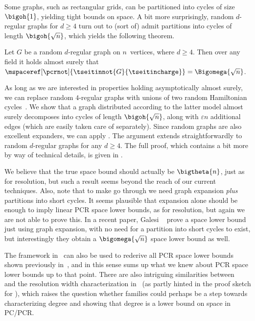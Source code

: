 \documentclass{toc}
\begin{document}
Some graphs, such as rectangular grids, can be partitioned into cycles
of size~$\bigoh{1}$, yielding tight bounds on space.
A bit more surprisingly, random \mbox{$d$-regular} graphs for $d \geq 4$ turn out to
(sort of)
admit partitions into cycles of %
length
$\bigoh{\sqrt{n}}$,
which yields the following theorem.

\begin{theorem}
  \label{thm:improved-general}
  Let $G$ be a random $d$-regular graph on $n$~vertices, where $d\geq 4$.
  Then over any field it holds almost surely that
  $\mspaceref[\pcrnot]{\tseitinnot{G}{\tseitincharge}} = \Bigomega{\sqrt{n}}$.
\end{theorem}

\begin{ourproof}[sketch]
  As long as we are interested in properties holding asymptotically
  almost surely, we can replace random $4$-regular graphs with unions
  of two random Hamiltonian cycles~\cite{KW}.
  We show that a graph distributed according to the latter
  model almost surely decomposes into cycles of length
  $\bigoh{\sqrt{n}}$, along with $\varepsilon n$ additional edges 
  (which are easily taken care of separately).
  Since random graphs are also excellent expanders, we can
  apply 
 .
  The argument  
  extends straightforwardly
  to random $d$-regular graphs for any 
  $d  \geq 4$.
  The full proof, which contains a bit more by way of technical
  details, is  given in
 .
\end{ourproof}

%
We 
%
believe that the true space bound should actually be
$\bigtheta{n}$, just as for resolution, but such a result seems beyond
the reach of 
our current techniques.
%
Also, note that to make
go through we need graph expansion
\emph{plus}
partitions into %
short cycles.
%
It seems 
%
plausible that expansion alone should 
be enough to imply
linear PCR space lower bounds, as for resolution, but again
we are not able to prove this.
In a recent paper, Galesi \etal~\cite{GKT19SpaceWidth}
  prove a space lower bound just using graph expansion, with no need
  for a partition into %
  short cycles to exist, but interestingly they
  obtain a $\bigomega{\sqrt{n}}$ space lower bound as well.


%
\label{sec:space-compl-funct}


The framework in~\cite{BG15Framework} can also be used to
rederive all PCR space lower bounds shown previously 
in~\cite{ABRW02SpaceComplexity,FLNRT15SpaceCplx}, and in this sense
\cite{BG15Framework} 
sums up what we knew about PCR space lower bounds up to that point.
There are also intriguing similarities between~%
\cite{BG15Framework} 
and the resolution width characterization 
  in~\cite{AD08CombinatoricalCharacterization}
(as partly hinted in the proof sketch for
),
which raises the question whether
\kextendibleNok families 
could perhaps be a step towards
characterizing degree and showing that degree
%
%
is a lower bound on  %
%
%
space in PC/PCR.
\end{document}
